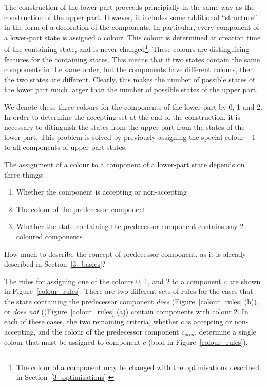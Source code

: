 The construction of the lower part proceeds principially in the same way as the construction of the upper part. However, it includes some additional ``structure'' in the form of a decoration of the components. In particular, every component of a lower-part state is assigned a colour. This colour is determined at creation time of the containing state, and is never changed\footnote{The colour of a component may be changed with the optimisations described in Section~\ref{3_optimisations}.}. These colours are distinguising features for the containing states. This means that if two states contain the same components in the same order, but the components have different colours, then the two states are different. Clearly, this makes the number of possible states of the lower part much larger than the number of possible states of the upper part.

We denote these three colours for the components of the lower part by 0, 1 and 2. In order to determine the accepting set at the end of the construction, it is necessary to ditinguish the states from the upper part from the states of the lower part. This problem is solved by previously assigning the special colour $-1$ to all components of upper part-states.

The assignment of a colour to a component of a lower-part state depends on three things:
\begin{enumerate}
\item Whether the component is accepting or non-accepting
\item The colour of the predecessor component
\item Whether the state containing the predecessor component contains any 2-coloured components
\end{enumerate}

How much to describe the concept of predecessor component, as it is already described in Section~\ref{3_basics}?

The rules for assigning one of the colours 0, 1, and 2 to a component $c$ are shown in Figure~\ref{colour_rules}. There are two different sets of rules for the cases that the state containing the predecessor component \textit{does} (Figure~\ref{colour_rules} (b)), or \textit{does not} ((Figure~\ref{colour_rules} (a)) contain components with colour 2. In each of these cases, the two remaining criteria, whether $c$ is accepting or non-accepting, and the colour of the predecessor component $c_{pred}$, determine a single colour that must be assigned to component $c$ (bold in Figure~\ref{colour_rules}). 

